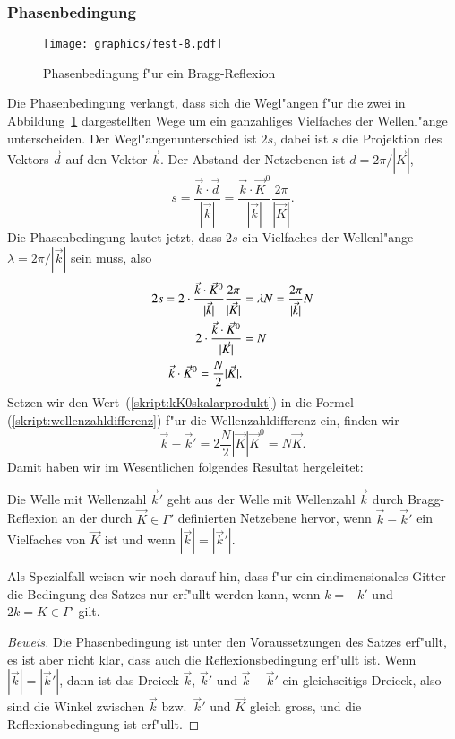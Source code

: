 \subsubsection{Phasenbedingung}
%
\begin{figure}
\centering
\texttt{[image: graphics/fest-8.pdf]}
\caption{Phasenbedingung f"ur ein Bragg-Reflexion
\label{skript:phasenbedingung}}
\end{figure}
Die Phasenbedingung verlangt, dass sich die Wegl"angen f"ur die zwei in
Abbildung~\ref{skript:phasenbedingung} dargestellten Wege um ein
ganzahliges Vielfaches der Wellenl"ange unterscheiden.
Der Wegl"angenunterschied ist $2s$, dabei ist $s$ die Projektion des
Vektors $\vec d$ auf den Vektor $\vec k$. Der Abstand der Netzebenen
ist $d=2\pi / |\vec K|$,
\[
s
=
\frac{\vec k\cdot \vec d}{|\vec k|}
=
\frac{\vec k\cdot \vec K^0}{|\vec k|}\frac{2\pi}{|\vec K|}.
\]
Die Phasenbedingung lautet jetzt, dass $2s$ ein Vielfaches der Wellenl"ange
$\lambda = 2\pi/|\vec k|$ sein muss, also
\begin{align}
2s
=
2\cdot \frac{\vec k\cdot \vec K^0}{|\vec k|}\frac{2\pi}{|\vec K|}
&=
\lambda N
=
\frac{2\pi}{|\vec k|} N
\notag
\\
2\cdot \frac{\vec k\cdot \vec K^0}{|\vec K|}
&=
N
\notag
\\
\vec k\cdot \vec K^0=\frac{N}2 |\vec K|.
\label{skript:kK0skalarprodukt}
\end{align}
Setzen wir den Wert~(\ref{skript:kK0skalarprodukt}) in die Formel
(\ref{skript:wellenzahldifferenz})
f"ur die Wellenzahldifferenz ein, finden wir
\[
\vec k-\vec k'=2 \frac{N}2 |\vec K|\vec K^0=N\vec K.
\]
Damit haben wir im Wesentlichen folgendes Resultat hergeleitet:
\begin{satz}
\label{skript:braggsatz}
Die Welle mit Wellenzahl $\vec k'$ geht aus der Welle mit Wellenzahl
$\vec k$ durch
Bragg-Reflexion an der durch $\vec K\in\Gamma'$ definierten Netzebene
hervor, wenn $\vec k-\vec k'$ ein Vielfaches von $\vec K$ ist und
wenn $|\vec k|=|\vec k'|$.
\end{satz}

Als Spezialfall weisen wir noch darauf hin, dass f"ur ein eindimensionales
Gitter die Bedingung des Satzes nur erf"ullt werden kann, wenn
$k=-k'$ und $2k=K\in\Gamma'$ gilt.

\begin{proof}[Beweis]
Die Phasenbedingung ist unter den Voraussetzungen des Satzes erf"ullt,
es ist aber nicht klar, dass auch die Reflexionsbedingung erf"ullt ist.
Wenn $|\vec k|=|\vec k'|$, dann ist das Dreieck $\vec k$, $\vec k'$
und $\vec k- \vec k'$ ein gleichseitigs Dreieck, also sind die Winkel
zwischen $\vec k$ bzw.~$\vec k'$ und $\vec K$ gleich gross, und die
Reflexionsbedingung ist erf"ullt.
\end{proof}

